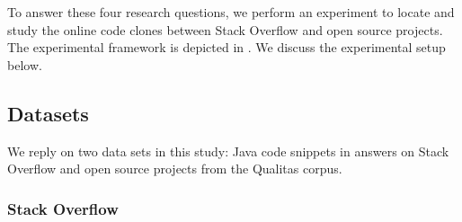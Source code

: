 \documentclass[sigconf,review, anonymous]{acmart}
\begin{document}
\vspace{1ex}
To answer these four research questions, we perform an experiment to
locate and study the online code clones between Stack Overflow and open source
projects. The experimental framework is depicted in . 
We discuss the experimental setup below.



\subsection{Datasets}

We reply on two data sets in this study: Java code snippets in answers
on Stack Overflow and open source projects from the Qualitas corpus.

\subsubsection{Stack Overflow} 
\end{document}
